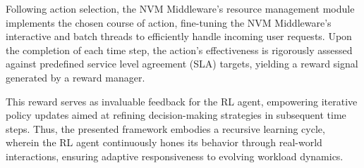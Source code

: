 Following action selection, the NVM Middleware's resource management module implements the chosen course of action, fine-tuning the NVM Middleware's interactive and batch threads to efficiently handle incoming user requests. Upon the completion of each time step, the action's effectiveness is rigorously assessed against predefined service level agreement (SLA) targets, yielding a reward signal generated by a reward manager.

This reward serves as invaluable feedback for the RL agent, empowering iterative policy updates aimed at refining decision-making strategies in subsequent time steps. Thus, the presented framework embodies a recursive learning cycle, wherein the RL agent continuously hones its behavior through real-world interactions, ensuring adaptive responsiveness to evolving workload dynamics.



